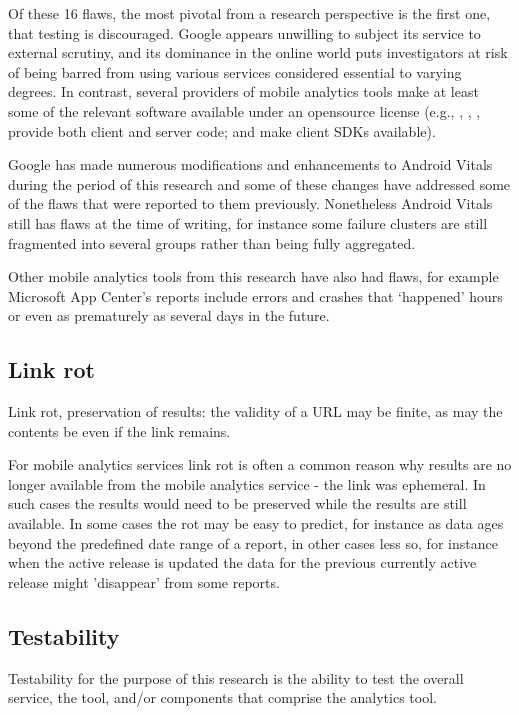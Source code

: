 Of these 16 flaws, the most pivotal from a research perspective is the first one, that testing is discouraged. Google appears unwilling to subject its service to external scrutiny, and its dominance in the online world puts investigators at risk of being barred from using various services considered essential to varying degrees. In contrast, several providers of mobile analytics tools make at least some of the relevant software available under an opensource license (e.g., , , ,  provide both client and server code;  and  make client SDKs available). 

Google has made numerous modifications and enhancements to Android Vitals during the period of this research and some of these changes have addressed some of the flaws that were reported to them previously. Nonetheless Android Vitals still has flaws at the time of writing, for instance some failure clusters are still fragmented into several groups rather than being fully aggregated.

Other mobile analytics tools from this research have also had flaws, for example Microsoft App Center's reports include errors and crashes that `happened' hours or even as prematurely as several days in the future. 

\subsection{Link rot}
Link rot, preservation of results: the validity of a URL may be finite, as may the contents be even if the link remains. 

For mobile analytics services link rot is often a common reason why results are no longer available from the mobile analytics service - the link was ephemeral. In such cases the results would need to be preserved while the results are still available. In some cases the rot may be easy to predict, for instance as data ages beyond the predefined date range of a report, in other cases less so, for instance when the active release is updated the data for the previous currently active release might 'disappear' from some reports.

\subsection{Testability}
Testability for the purpose of this research is the ability to test the overall service, the tool, and/or components that comprise the analytics tool. 

